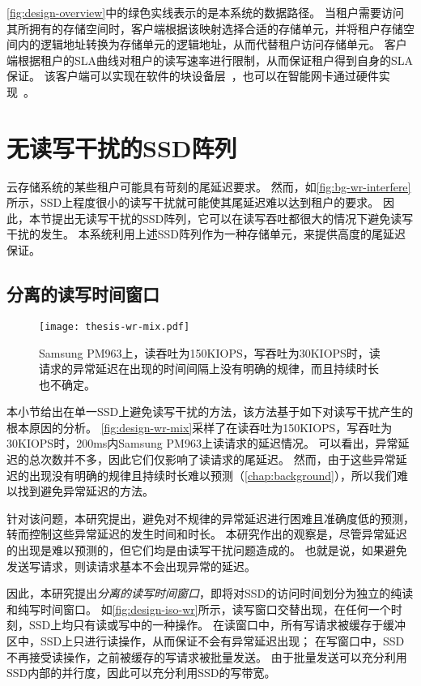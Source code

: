 \autoref{fig:design-overview}中的绿色实线表示的是本系统的数据路径。
当租户需要访问其所拥有的存储空间时，客户端根据该映射选择合适的存储单元，并将租户存储空间内的逻辑地址转换为存储单元的逻辑地址，从而代替租户访问存储单元。
客户端根据租户的SLA曲线对租户的读写速率进行限制，从而保证租户得到自身的SLA保证。
该客户端可以实现在软件的块设备层~\cite{linuxblock}，也可以在智能网卡通过硬件实现~\cite{bluefield}。

\section{无读写干扰的SSD阵列}
\label{sec:design-array}

云存储系统的某些租户可能具有苛刻的尾延迟要求。
然而，如\autoref{fig:bg-wr-interfere}所示，SSD上程度很小的读写干扰就可能使其尾延迟难以达到租户的要求。
因此，本节提出无读写干扰的SSD阵列，它可以在读写吞吐都很大的情况下避免读写干扰的发生。
本系统利用上述SSD阵列作为一种存储单元，来提供高度的尾延迟保证。

\subsection{分离的读写时间窗口}
\label{sec:design-array-isorw}

\begin{figure}[h]
  \centering
  \texttt{[image: thesis-wr-mix.pdf]}
  \caption{
        Samsung PM963上，读吞吐为150KIOPS，写吞吐为30KIOPS时，读请求的异常延迟在出现的时间间隔上没有明确的规律，而且持续时长也不确定。
      }
  \label{fig:design-wr-mix}
\end{figure}

本小节给出在单一SSD上避免读写干扰的方法，该方法基于如下对读写干扰产生的根本原因的分析。
\autoref{fig:design-wr-mix}采样了在读吞吐为150KIOPS，写吞吐为30KIOPS时，200ms内Samsung PM963上读请求的延迟情况。
可以看出，异常延迟的总次数并不多，因此它们仅影响了读请求的尾延迟。
然而，由于这些异常延迟的出现没有明确的规律且持续时长难以预测（\autoref{chap:background}），所以我们难以找到避免异常延迟的方法。

针对该问题，本研究提出，避免对不规律的异常延迟进行困难且准确度低的预测，转而控制这些异常延迟的发生时间和时长。
本研究作出的观察是，尽管异常延迟的出现是难以预测的，但它们均是由读写干扰问题造成的。
也就是说，如果避免发送写请求，则读请求基本不会出现异常的延迟。

因此，本研究提出\textit{分离的读写时间窗口}，即将对SSD的访问时间划分为独立的纯读和纯写时间窗口。
如\autoref{fig:design-iso-wr}所示，读写窗口交替出现，在任何一个时刻，SSD上均只有读或写中的一种操作。
在读窗口中，所有写请求被缓存于缓冲区中，SSD上只进行读操作，从而保证不会有异常延迟出现；
在写窗口中，SSD不再接受读操作，之前被缓存的写请求被批量发送。
由于批量发送可以充分利用SSD内部的并行度，因此可以充分利用SSD的写带宽。

